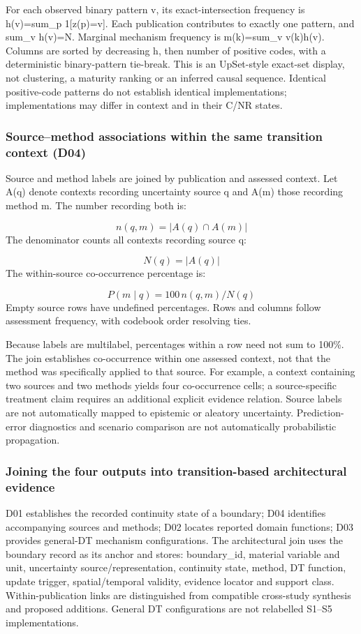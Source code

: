 For each observed binary pattern v, its exact-intersection frequency is h(v)=sum\_p 1[z(p)=v]. Each publication contributes to exactly one pattern, and sum\_v h(v)=N. Marginal mechanism frequency is m(k)=sum\_v v(k)h(v). Columns are sorted by decreasing h, then number of positive codes, with a deterministic binary-pattern tie-break. This is an UpSet-style exact-set display, not clustering, a maturity ranking or an inferred causal sequence. Identical positive-code patterns do not establish identical implementations; implementations may differ in context and in their C/NR states.


\subsubsection{Source–method associations within the same transition context (D04)}
Source and method labels are joined by publication and assessed context. Let A(q) denote contexts recording uncertainty source q and A(m) those recording method m. The number recording both is:

\[
n(q,m)=|A(q)\cap A(m)|
\]
The denominator counts all contexts recording source q:

\[
N(q)=|A(q)|
\]
The within-source co-occurrence percentage is:

\[
P(m\mid q)=100\,n(q,m)/N(q)
\]
Empty source rows have undefined percentages. Rows and columns follow assessment frequency, with codebook order resolving ties.

Because labels are multilabel, percentages within a row need not sum to 100\%. The join establishes co-occurrence within one assessed context, not that the method was specifically applied to that source. For example, a context containing two sources and two methods yields four co-occurrence cells; a source-specific treatment claim requires an additional explicit evidence relation. Source labels are not automatically mapped to epistemic or aleatory uncertainty. Prediction-error diagnostics and scenario comparison are not automatically probabilistic propagation.


\subsubsection{Joining the four outputs into transition-based architectural evidence}
D01 establishes the recorded continuity state of a boundary; D04 identifies accompanying sources and methods; D02 locates reported domain functions; D03 provides general-DT mechanism configurations. The architectural join uses the boundary record as its anchor and stores: boundary\_id, material variable and unit, uncertainty source/representation, continuity state, method, DT function, update trigger, spatial/temporal validity, evidence locator and support class. Within-publication links are distinguished from compatible cross-study synthesis and proposed additions. General DT configurations are not relabelled S1–S5 implementations.

